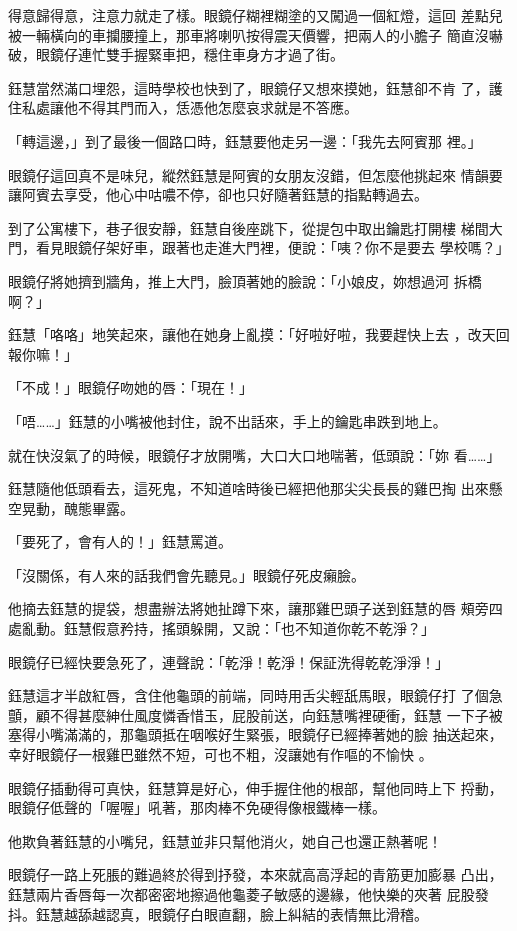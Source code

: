 得意歸得意，注意力就走了樣。眼鏡仔糊裡糊塗的又闖過一個紅燈，這回
差點兒被一輛橫向的車攔腰撞上，那車將喇叭按得震天價響，把兩人的小膽子
簡直沒嚇破，眼鏡仔連忙雙手握緊車把，穩住車身方才過了街。

鈺慧當然滿口埋怨，這時學校也快到了，眼鏡仔又想來摸她，鈺慧卻不肯
了，護住私處讓他不得其門而入，恁憑他怎麼哀求就是不答應。

「轉這邊，」到了最後一個路口時，鈺慧要他走另一邊：「我先去阿賓那
裡。」

眼鏡仔這回真不是味兒，縱然鈺慧是阿賓的女朋友沒錯，但怎麼他挑起來
情韻要讓阿賓去享受，他心中咕噥不停，卻也只好隨著鈺慧的指點轉過去。

到了公寓樓下，巷子很安靜，鈺慧自後座跳下，從提包中取出鑰匙打開樓
梯間大門，看見眼鏡仔架好車，跟著也走進大門裡，便說：「咦？你不是要去
學校嗎？」

眼鏡仔將她擠到牆角，推上大門，臉頂著她的臉說：「小娘皮，妳想過河
拆橋啊？」

鈺慧「咯咯」地笑起來，讓他在她身上亂摸：「好啦好啦，我要趕快上去
，改天回報你嘛！」

「不成！」眼鏡仔吻她的唇：「現在！」

「唔……」鈺慧的小嘴被他封住，說不出話來，手上的鑰匙串跌到地上。

就在快沒氣了的時候，眼鏡仔才放開嘴，大口大口地喘著，低頭說：「妳
看……」

鈺慧隨他低頭看去，這死鬼，不知道啥時後已經把他那尖尖長長的雞巴掏
出來懸空晃動，醜態畢露。

「要死了，會有人的！」鈺慧罵道。

「沒關係，有人來的話我們會先聽見。」眼鏡仔死皮癩臉。

他摘去鈺慧的提袋，想盡辦法將她扯蹲下來，讓那雞巴頭子送到鈺慧的唇
頰旁四處亂動。鈺慧假意矜持，搖頭躲開，又說：「也不知道你乾不乾淨？」

眼鏡仔已經快要急死了，連聲說：「乾淨！乾淨！保証洗得乾乾淨淨！」

鈺慧這才半啟紅唇，含住他龜頭的前端，同時用舌尖輕舐馬眼，眼鏡仔打
了個急顫，顧不得甚麼紳仕風度憐香惜玉，屁股前送，向鈺慧嘴裡硬衝，鈺慧
一下子被塞得小嘴滿滿的，那龜頭抵在咽喉好生緊張，眼鏡仔已經捧著她的臉
抽送起來，幸好眼鏡仔一根雞巴雖然不短，可也不粗，沒讓她有作嘔的不愉快
。

眼鏡仔插動得可真快，鈺慧算是好心，伸手握住他的根部，幫他同時上下
捋動，眼鏡仔低聲的「喔喔」吼著，那肉棒不免硬得像根鐵棒一樣。

他欺負著鈺慧的小嘴兒，鈺慧並非只幫他消火，她自己也還正熱著呢！

眼鏡仔一路上死脹的難過終於得到抒發，本來就高高浮起的青筋更加膨暴
凸出，鈺慧兩片香唇每一次都密密地擦過他龜菱子敏感的邊緣，他快樂的夾著
屁股發抖。鈺慧越舔越認真，眼鏡仔白眼直翻，臉上糾結的表情無比滑稽。

